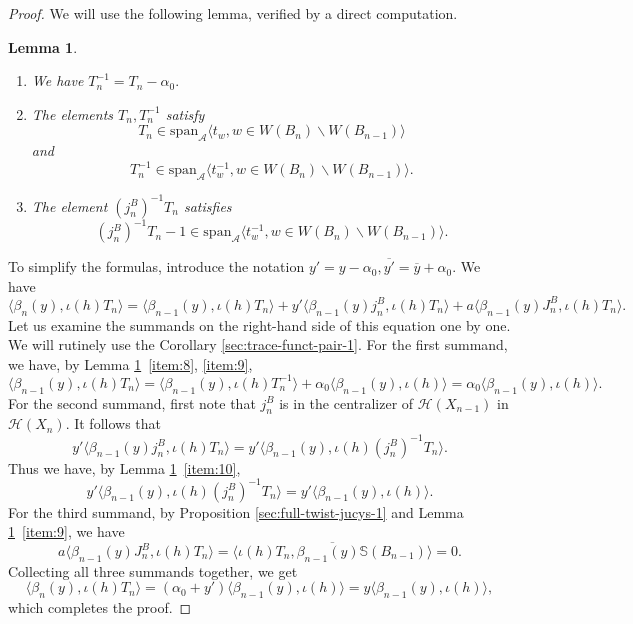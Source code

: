 \documentclass[11pt,leqno]{article}
\newtheorem{lemma}[theorem]{Lemma}
\theoremstyle{definition}
\theoremstyle{definition}
\theoremstyle{remark}
\newcommand{\He}{\mathcal{H}}
\newcommand{\Se}{\mathbb{S}}
\begin{document}
\begin{proof}
   We will use the following lemma, verified by a direct computation.
  \begin{lemma}
    \label{sec:gener-mark-trac}
    \begin{enumerate}[label=(\alph*).,ref=(\alph*)]
    \item \label{item:8} We have $T_n^{-1} = T_n - \alpha_0.$
    \item \label{item:9} The elements $T_n, T_n^{-1}$ satisfy \[T_n \in \mathrm{span}_{\mathcal A}\langle t_w, w \in W(B_n)\backslash W(B_{n-1})\rangle\] and \[T_n^{-1} \in \mathrm{span}_{\mathcal A}\langle t_w^{-1}, w \in W(B_n)\backslash W(B_{n-1})\rangle.\]
    \item \label{item:10} The element $(j^B_n)^{-1}T_n$ satisfies \[(j^B_n)^{-1}T_n - 1\in \mathrm{span}_{\mathcal A}\langle t_w^{-1}, w \in W(B_n)\backslash W(B_{n-1})\rangle.\]
    \end{enumerate}
  \end{lemma}

  To simplify the formulas, introduce the notation $y' = y-\alpha_0, \overline{y'} = \overline{y}+\alpha_0$. We have
  \begin{equation*}
    \langle\beta_n(y), \iota(h)T_n\rangle = \langle\beta_{n-1}(y), \iota(h)T_n\rangle + {y'}\langle\beta_{n-1}(y)j^B_n,\iota(h)T_n\rangle +a\langle\beta_{n-1}(y)J_n^B, \iota(h)T_n\rangle.
  \end{equation*}
  Let us examine the summands on the right-hand side of this equation one by one. We will rutinely use the Corollary \ref{sec:trace-funct-pair-1}. For the first summand, we have, by Lemma \ref{sec:gener-mark-trac}~\ref{item:8}, \ref{item:9}, 
  \[
   \langle\beta_{n-1}(y), \iota(h)T_n\rangle = \langle\beta_{n-1}(y), \iota(h)T_{n}^{-1}\rangle + \alpha_0\langle\beta_{n-1}(y), \iota(h)\rangle = \alpha_0\langle\beta_{n-1}(y), \iota(h)\rangle.
  \]
  For the second summand, first note that $j^B_n$ is in the centralizer of $\He(X_{n-1})$ in $\He(X_n)$. It follows that
  \[
  {y'}\langle\beta_{n-1}(y)j^B_n,\iota(h)T_n\rangle = {y'}\langle\beta_{n-1}(y),\iota(h)(j_n^B)^{-1} T_n\rangle.
  \]
  Thus we have, by Lemma \ref{sec:gener-mark-trac}~\ref{item:10}, 
  \[
 {y'}\langle\beta_{n-1}(y),\iota(h)(j^{B}_n)^{-1}T_n\rangle = y'\langle\beta_{n-1}(y), \iota(h)\rangle.
  \]
  For the third summand, by Proposition \ref{sec:full-twist-jucys-1} and Lemma \ref{sec:gener-mark-trac}~\ref{item:9}, we have
  \[
    a\langle\beta_{n-1}(y)J_n^B, \iota(h)T_n\rangle = \overline{\langle\iota(h)T_n, \beta_{n-1}(y)\Se(B_{n-1})\rangle} = 0. 
  \]
  Collecting all three summands together, we get
  \[
    \langle\beta_n(y), \iota(h)T_n\rangle = (\alpha_0+y')\langle\beta_{n-1}(y),\iota(h)\rangle = y\langle\beta_{n-1}(y),\iota(h)\rangle,
  \]
  which completes the proof.
\end{proof}
\end{document}
